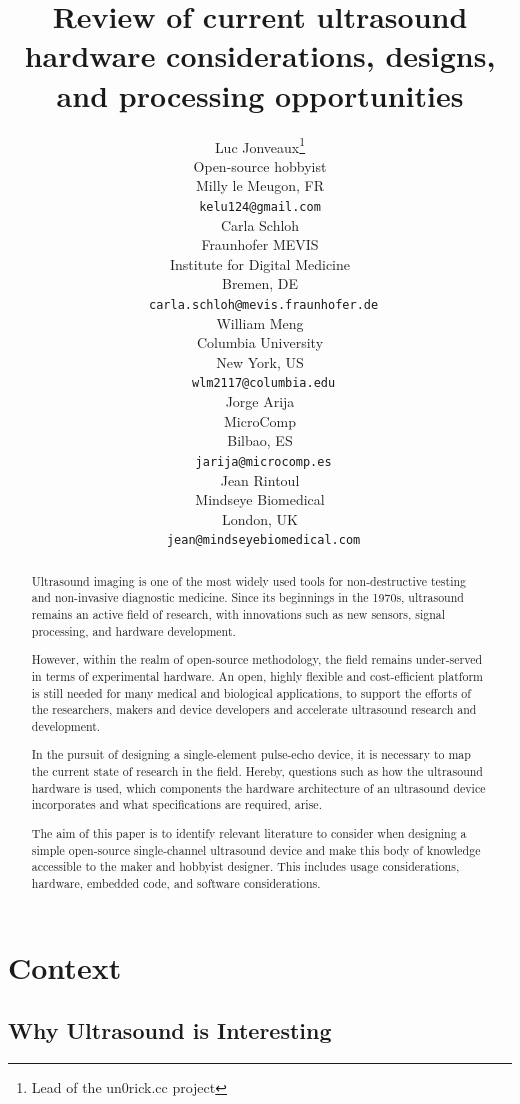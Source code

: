 \documentclass{article}
\title{Review of current ultrasound hardware considerations, designs, and processing opportunities}
\author{
 Luc Jonveaux\thanks{Lead of the un0rick.cc project } \\
 Open-source hobbyist \\
 Milly le Meugon, FR\\
 \texttt{kelu124@gmail.com} \\
 \And
 Carla Schloh \\
 Fraunhofer MEVIS\\
 Institute for Digital Medicine\\
 Bremen, DE\\
 \texttt{ carla.schloh@mevis.fraunhofer.de} \\
\And
 William Meng \\
Columbia University \\
 New York, US\\
 \texttt{ wlm2117@columbia.edu} \\
 \And
 Jorge Arija \\
MicroComp \\
 Bilbao, ES\\
 \texttt{ jarija@microcomp.es} \\
   \And
 Jean Rintoul \\
Mindseye Biomedical \\
 London, UK\\
 \texttt{ jean@mindseyebiomedical.com} \\
 }
\begin{document}
\maketitle

\begin{abstract}

Ultrasound imaging is one of the most widely used tools for non-destructive testing and non-invasive diagnostic medicine.
Since its beginnings in the 1970s, ultrasound remains an active field of research,
with innovations such as new sensors, signal processing, and hardware development.

However, within the realm of open-source methodology, the field remains under-served in terms of experimental hardware.
An open, highly flexible and cost-efficient platform is still needed for many medical and biological applications, to support the efforts of the researchers, makers and device developers and accelerate ultrasound research and development.

In the pursuit of designing a single-element pulse-echo device, it is necessary to map the current state of research in the field. Hereby, questions such as how the ultrasound hardware is used, which components the hardware architecture of an ultrasound device incorporates and what specifications are required, arise. 

The aim of this paper is to identify relevant literature to consider when designing a simple open-source single-channel ultrasound device and make this body of knowledge accessible to the maker and hobbyist designer. This includes usage considerations, hardware, embedded code, and software considerations.
\end{abstract}




\newpage


\section{Context}

\subsection{Why Ultrasound is Interesting}
\end{document}
